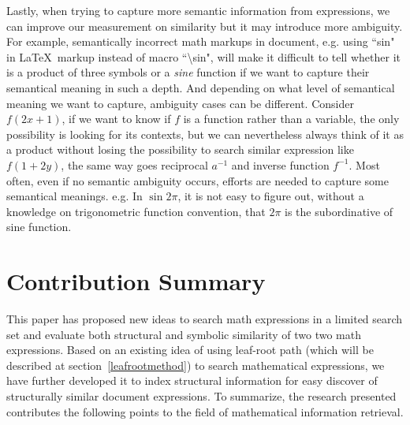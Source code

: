 Lastly, when trying to capture more semantic information from expressions, we can improve our measurement on similarity but it may introduce more ambiguity. 
For example, semantically incorrect math markups in document, e.g. using ``sin" in \LaTeX\ markup instead of macro ``\textbackslash sin", will make it difficult to tell whether it is a product of three symbols or a \textit{sine} function if we want to capture their semantical meaning in such a depth. 
And depending on what level of semantical meaning we want to capture, ambiguity cases can be different. 
Consider $f(2x+1)$, if we want to know if $f$ is a function rather than a variable, the only possibility is looking for its contexts, but we can nevertheless always think of it as a product without losing the possibility to search similar expression like $f(1 + 2y)$, the same way goes reciprocal $a^{-1}$ and inverse function $f^{-1}$. 
Most often, even if no semantic ambiguity occurs, efforts are needed to capture some semantical meanings. e.g. In $\sin 2 \pi$, it is not easy to figure out,
 without a knowledge on trigonometric function convention, that $2 \pi$ is the subordinative of sine function.

\section{Contribution Summary}
This paper has proposed new ideas to search math expressions in a limited search set and evaluate both structural and symbolic similarity of two two math expressions.
Based on an existing idea of using leaf-root path (which will be described at section~\ref{leafrootmethod}) to search mathematical expressions, we have further developed it to index structural information for easy discover of structurally similar document expressions. 
To summarize, the research presented contributes the following points to the field of mathematical information retrieval.

